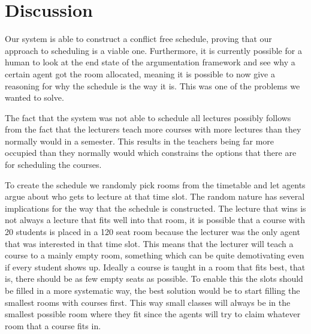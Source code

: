 \section{Discussion}
Our system is able to construct a conflict free schedule, proving that our
approach to scheduling is a viable one. Furthermore, it is currently
possible for a human to look at the end state of the argumentation
framework and see why a certain agent got the room allocated, meaning it is
possible to now give a reasoning for why the schedule is the way it is.
This was one of the problems we wanted to solve.

The fact that the system was not able to schedule all lectures possibly follows
from the fact that the lecturers teach more courses with more lectures than
they normally would in a semester. This results in the teachers being far more
occupied than they normally would which constrains the options that there are
for scheduling the courses.

To create the schedule we randomly pick rooms from the timetable and let agents
argue about who gets to lecture at that time slot. The random nature has several
implications for the way that the schedule is constructed. The lecture that wins
is not always a lecture that fits well into that room, it is possible that a
course with 20 students is placed in a 120 seat room because the lecturer was
the only agent that was interested in that time slot. This means that the
lecturer will teach a course to a mainly empty room, something which can be
quite demotivating even if every student shows up. Ideally a course is taught in
a room that fits best, that is, there should be as few empty seats as possible.
To enable this the slots should be filled in a more systematic way, the best
solution would be to start filling the smallest rooms with courses first. This
way small classes will always be in the smallest possible room where they fit
since the agents will try to claim whatever room that a course fits in.


